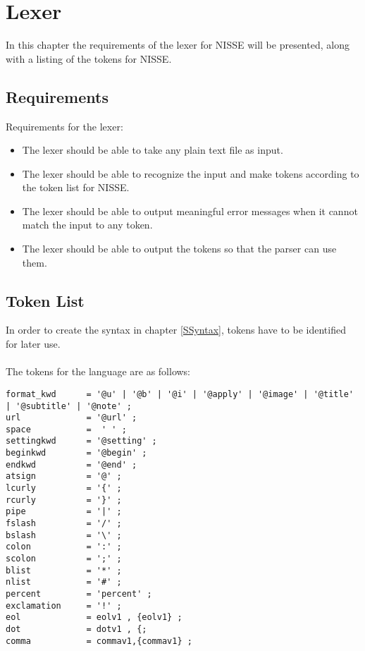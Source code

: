 \chapter{Lexer}
In this chapter the requirements of the lexer for NISSE will be presented, along with a listing of the tokens for NISSE.
\section{Requirements}
Requirements for the lexer:
\begin{itemize}
		\item The lexer should be able to take any plain text file as input.
		\item The lexer should be able to recognize the input and make tokens according to the token list for NISSE.
		\item The lexer should be able to output meaningful error messages when it cannot match the input to any token.
		\item The lexer should be able to output the tokens so that the parser can use them.
\end{itemize}

\newpage
\section{Token List}
In order to create the syntax in chapter \ref{SSyntax}, tokens have to be identified for later use.
\\ \\
The tokens for the language are as follows:

\begin{lstlisting}[frame=single]
format_kwd      = '@u' | '@b' | '@i' | '@apply' | '@image' | '@title' | '@subtitle' | '@note' ;
url             = '@url' ;
space           =  ' ' ;
settingkwd      = '@setting' ;
beginkwd        = '@begin' ;
endkwd          = '@end' ;
atsign          = '@' ;
lcurly          = '{' ;
rcurly          = '}' ;
pipe            = '|' ;
fslash          = '/' ;
bslash          = '\' ;
colon           = ':' ;
scolon          = ';' ;
blist           = '*' ;
nlist           = '#' ;
percent         = 'percent' ;
exclamation     = '!' ;
eol             = eolv1 , {eolv1} ;
dot             = dotv1 , {;
comma           = commav1,{commav1} ;
\end{lstlisting}

